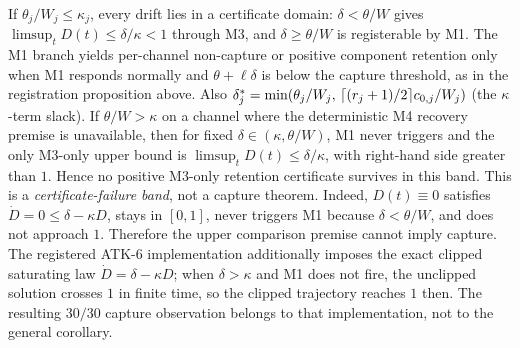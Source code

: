 \begin{corollary}
If $\theta_j/W_j\le\kappa_j$, every drift lies in a certificate domain:
$\delta<\theta/W$ gives $\limsup_tD(t)\le\delta/\kappa<1$ through M3, and
$\delta\ge\theta/W$ is registerable by M1. The M1 branch yields per-channel
non-capture or positive component retention only when M1 responds normally and
$\theta+\ell\delta$ is below the capture threshold, as in the registration
proposition above. Also
$\delta^{*}_j=\min(\theta_j/W_j,\,\lceil(r_j+1)/2\rceil c_{0,j}/W_j)$
(the $\kappa$-term slack). If $\theta/W>\kappa$ on a channel where the
deterministic M4 recovery premise is unavailable, then for fixed
$\delta\in(\kappa,\theta/W)$, M1 never triggers and the only M3-only upper
bound is $\limsup_tD(t)\le\delta/\kappa$, with right-hand side greater than
$1$. Hence no positive M3-only retention certificate survives in this band.
This is a \emph{certificate-failure band}, not a capture theorem. Indeed,
$D(t)\equiv0$ satisfies $\dot D=0\le\delta-\kappa D$, stays in $[0,1]$, never
triggers M1 because $\delta<\theta/W$, and does not approach $1$. Therefore
the upper comparison premise cannot imply capture. The registered ATK-6
implementation additionally imposes the exact clipped saturating law
$\dot D=\delta-\kappa D$; when $\delta>\kappa$ and M1 does not fire, the
unclipped solution crosses $1$ in finite time, so the clipped trajectory
reaches $1$ then. The resulting $30/30$ capture observation
belongs to that implementation, not to the general corollary.
\end{corollary}

